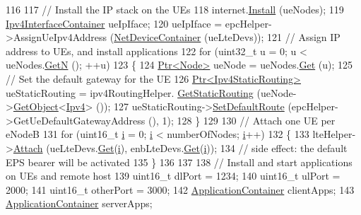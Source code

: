 \begin{DoxyCode}
116 
117   \textcolor{comment}{// Install the IP stack on the UEs}
118   internet.\hyperlink{classns3_1_1InternetStackHelper_a6645b412f31283d2d9bc3d8a95cebbc0}{Install} (ueNodes);
119   \hyperlink{classns3_1_1Ipv4InterfaceContainer}{Ipv4InterfaceContainer} ueIpIface;
120   ueIpIface = epcHelper->AssignUeIpv4Address (\hyperlink{classns3_1_1NetDeviceContainer}{NetDeviceContainer} (ueLteDevs));
121   \textcolor{comment}{// Assign IP address to UEs, and install applications}
122   \textcolor{keywordflow}{for} (uint32\_t u = 0; u < ueNodes.\hyperlink{classns3_1_1NodeContainer_aed647ac56d0407a7706aba02eb44b951}{GetN} (); ++u)
123     \{
124       \hyperlink{classns3_1_1Ptr}{Ptr<Node>} ueNode = ueNodes.\hyperlink{classns3_1_1NodeContainer_a9ed96e2ecc22e0f5a3d4842eb9bf90bf}{Get} (u);
125       \textcolor{comment}{// Set the default gateway for the UE}
126       \hyperlink{classns3_1_1Ptr}{Ptr<Ipv4StaticRouting>} ueStaticRouting = ipv4RoutingHelper.
      \hyperlink{classns3_1_1Ipv4StaticRoutingHelper_a731206e50d305695dac7fb2ef963a4bb}{GetStaticRouting} (ueNode->\hyperlink{classns3_1_1Object_a13e18c00017096c8381eb651d5bd0783}{GetObject}<\hyperlink{classns3_1_1Ipv4}{Ipv4}> ());
127       ueStaticRouting->\hyperlink{classns3_1_1Ipv4StaticRouting_aee30fa3246c2b42f122dabdff2725331}{SetDefaultRoute} (epcHelper->GetUeDefaultGatewayAddress (), 1);
128     \}
129 
130   \textcolor{comment}{// Attach one UE per eNodeB}
131   \textcolor{keywordflow}{for} (uint16\_t \hyperlink{bernuolliDistribution_8m_a6f6ccfcf58b31cb6412107d9d5281426}{i} = 0; \hyperlink{bernuolliDistribution_8m_a6f6ccfcf58b31cb6412107d9d5281426}{i} < numberOfNodes; \hyperlink{bernuolliDistribution_8m_a6f6ccfcf58b31cb6412107d9d5281426}{i}++)
132       \{
133         lteHelper->\hyperlink{classns3_1_1LteHelper_a9466743f826aa2652a87907b7f0a1c87}{Attach} (ueLteDevs.\hyperlink{classns3_1_1NetDeviceContainer_a677d62594b5c9d2dea155cc5045f4d0b}{Get}(\hyperlink{bernuolliDistribution_8m_a6f6ccfcf58b31cb6412107d9d5281426}{i}), enbLteDevs.\hyperlink{classns3_1_1NetDeviceContainer_a677d62594b5c9d2dea155cc5045f4d0b}{Get}(\hyperlink{bernuolliDistribution_8m_a6f6ccfcf58b31cb6412107d9d5281426}{i}));
134         \textcolor{comment}{// side effect: the default EPS bearer will be activated}
135       \}
136 
137 
138   \textcolor{comment}{// Install and start applications on UEs and remote host}
139   uint16\_t dlPort = 1234;
140   uint16\_t ulPort = 2000;
141   uint16\_t otherPort = 3000;
142   \hyperlink{classns3_1_1ApplicationContainer}{ApplicationContainer} clientApps;
143   \hyperlink{classns3_1_1ApplicationContainer}{ApplicationContainer} serverApps;

\end{DoxyCode}
